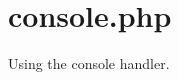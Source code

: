 \hypertarget{console_8php-example}{
\section{console.php}
}
Using the console handler.


\begin{DoxyCodeInclude}
\end{DoxyCodeInclude}
 